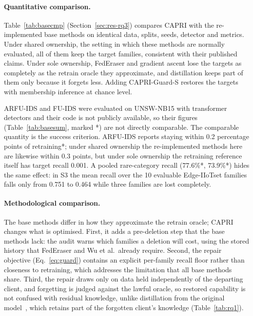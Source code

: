 \documentclass[pdflatex,sn-mathphys-num,iicol]{sn-jnl}
\begin{document}
\paragraph{Quantitative comparison.} Table~\ref{tab:basecmp} (Section~\ref{sec:res-rq3}) compares CAPRI with the re-implemented base methods on identical data, splits, seeds, detector and metrics. Under shared ownership, the setting in which these methods are normally evaluated, all of them keep the target families, consistent with their published claims. Under sole ownership, FedEraser and gradient ascent lose the targets as completely as the retrain oracle they approximate, and distillation keeps part of them only because it forgets less. Adding CAPRI-Guard-S restores the targets with membership inference at chance level.



ARFU-IDS and FU-IDS were evaluated on UNSW-NB15 with transformer detectors and their code is not publicly available, so their figures (Table~\ref{tab:basesum}, marked *) are not directly comparable. The comparable quantity is the success criterion. ARFU-IDS reports staying within 0.2 percentage points of retraining*; under shared ownership the re-implemented methods here are likewise within 0.3 points, but under sole ownership the retraining reference itself has target recall 0.001. A pooled rare-category recall (77.6\%*, 73.9\%*) hides the same effect: in S3 the mean recall over the 10 evaluable Edge-IIoTset families falls only from 0.751 to 0.464 while three families are lost completely.

\paragraph{Methodological comparison.} The base methods differ in how they approximate the retrain oracle; CAPRI changes what is optimised. First, it adds a pre-deletion step that the base methods lack: the audit warns which families a deletion will cost, using the stored history that FedEraser and Wu et al.\ already require. Second, the repair objective (Eq.~\ref{eq:guard}) contains an explicit per-family recall floor rather than closeness to retraining, which addresses the limitation that all base methods share. Third, the repair draws only on data held independently of the departing client, and forgetting is judged against the lawful oracle, so restored capability is not confused with residual knowledge, unlike distillation from the original model~\cite{wu2022distill}, which retains part of the forgotten client's knowledge (Table~\ref{tab:rq1}).
\end{document}
